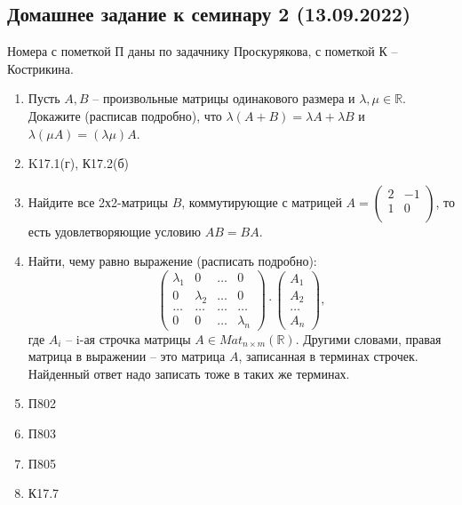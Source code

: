 \documentclass[12pt, a4paper]{extarticle}
\def \R{\mathbb{R}}
\theoremstyle{definition}
\begin{document}
    \subsection*{Домашнее задание к семинару 2 (13.09.2022)}
    Номера с пометкой П даны по задачнику Проскурякова, с пометкой К -- Кострикина.
    \begin{enumerate}
        \item Пусть $A, B$ -- произвольные матрицы одинакового размера и $\lambda, \mu \in \R$.
        Докажите (расписав подробно), что $\lambda (A+B) = \lambda A + \lambda B$ и $\lambda (\mu A) = (\lambda \mu) A$.
        \item K17.1(г), К17.2(б)
        \item Найдите все 2х2-матрицы $B$, коммутирующие с матрицей
        $A=\begin{pmatrix}
            2 & -1 \\
            1 & 0 \\
        \end{pmatrix}$, то есть удовлетворяющие условию $AB = BA$.
        \item Найти, чему равно выражение (расписать подробно):
        \[
        \begin{pmatrix}
            \lambda_1 & 0 & \dots & 0 \\
            0 & \lambda_2 & \dots & 0 \\
            \dots & \dots & \dots & \dots \\
            0 & 0 & \dots & \lambda_n
        \end{pmatrix}  
        \cdot 
        \begin{pmatrix}
            A_1 \\
            A_2 \\
            \dots \\
            A_n
        \end{pmatrix},
        \] 
        где $A_i$ -- i-ая строчка матрицы $A \in Mat_{n\times m}(\R)$.
        Другими словами, правая матрица в выражении -- это матрица $A$, записанная в терминах строчек. Найденный ответ надо записать тоже в таких же терминах.
        \item П802
        \item П803
        \item П805
        \item К17.7
         
        
    \end{enumerate}
    
\end{document}
